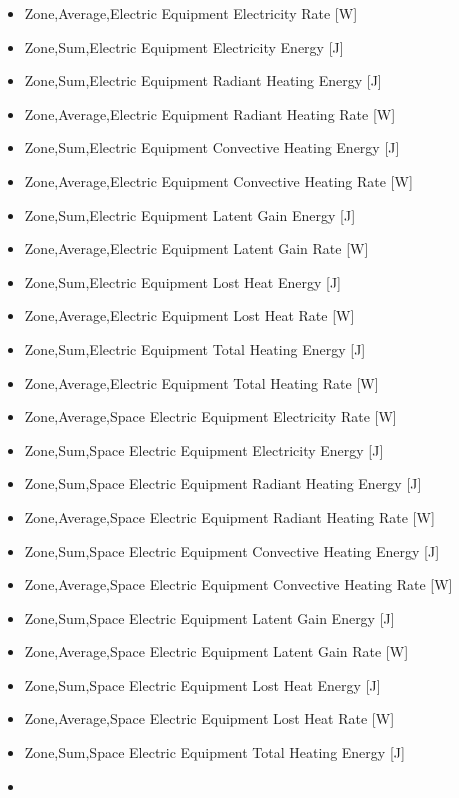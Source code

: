 \begin{itemize}
\item
  Zone,Average,Electric Equipment Electricity Rate {[}W{]}
\item
  Zone,Sum,Electric Equipment Electricity Energy {[}J{]}
\item
  Zone,Sum,Electric Equipment Radiant Heating Energy {[}J{]}
\item
  Zone,Average,Electric Equipment Radiant Heating Rate {[}W{]}
\item
  Zone,Sum,Electric Equipment Convective Heating Energy {[}J{]}
\item
  Zone,Average,Electric Equipment Convective Heating Rate {[}W{]}
\item
  Zone,Sum,Electric Equipment Latent Gain Energy {[}J{]}
\item
  Zone,Average,Electric Equipment Latent Gain Rate {[}W{]}
\item
  Zone,Sum,Electric Equipment Lost Heat Energy {[}J{]}
\item
  Zone,Average,Electric Equipment Lost Heat Rate {[}W{]}
\item
  Zone,Sum,Electric Equipment Total Heating Energy {[}J{]}
\item
  Zone,Average,Electric Equipment Total Heating Rate {[}W{]}
\item
  Zone,Average,Space Electric Equipment Electricity Rate {[}W{]}
\item
  Zone,Sum,Space Electric Equipment Electricity Energy {[}J{]}
\item
  Zone,Sum,Space Electric Equipment Radiant Heating Energy {[}J{]}
\item
  Zone,Average,Space Electric Equipment Radiant Heating Rate {[}W{]}
\item
  Zone,Sum,Space Electric Equipment Convective Heating Energy {[}J{]}
\item
  Zone,Average,Space Electric Equipment Convective Heating Rate {[}W{]}
\item
  Zone,Sum,Space Electric Equipment Latent Gain Energy {[}J{]}
\item
  Zone,Average,Space Electric Equipment Latent Gain Rate {[}W{]}
\item
  Zone,Sum,Space Electric Equipment Lost Heat Energy {[}J{]}
\item
  Zone,Average,Space Electric Equipment Lost Heat Rate {[}W{]}
\item
  Zone,Sum,Space Electric Equipment Total Heating Energy {[}J{]}
\item

\end{itemize}
